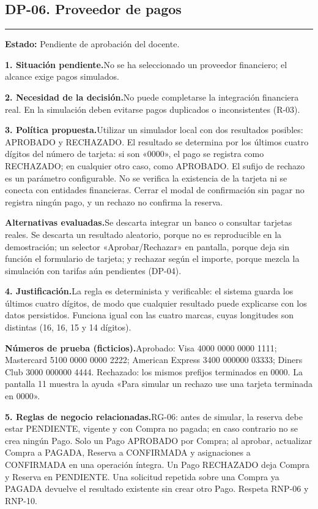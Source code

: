 \documentclass[11pt,a4paper]{article}
\newcommand{\fichacampo}[2]{\noindent\textbf{\color{azulvip}#1}\enspace #2\par\vspace{3pt}}
\begin{document}
\subsection{DP-06. Proveedor de pagos}
{\color{doradovip}\rule{\textwidth}{.5pt}}
\textbf{Estado:} Pendiente de aprobación del docente.\par\vspace{4pt}
{\normalsize
\fichacampo{1. Situación pendiente.}{No se ha seleccionado un proveedor financiero; el alcance exige pagos simulados.}
\fichacampo{2. Necesidad de la decisión.}{No puede completarse la integración financiera real. En la simulación deben evitarse pagos duplicados o inconsistentes (R-03).}
\fichacampo{3. Política propuesta.}{Utilizar un simulador local con dos resultados posibles: APROBADO y RECHAZADO. El resultado se determina por los últimos cuatro dígitos del número de tarjeta: si son «0000», el pago se registra como RECHAZADO; en cualquier otro caso, como APROBADO. El sufijo de rechazo es un parámetro configurable. No se verifica la existencia de la tarjeta ni se conecta con entidades financieras. Cerrar el modal de confirmación sin pagar no registra ningún pago, y un rechazo no confirma la reserva.}
\fichacampo{Alternativas evaluadas.}{Se descarta integrar un banco o consultar tarjetas reales. Se descarta un resultado aleatorio, porque no es reproducible en la demostración; un selector «Aprobar/Rechazar» en pantalla, porque deja sin función el formulario de tarjeta; y rechazar según el importe, porque mezcla la simulación con tarifas aún pendientes (DP-04).}
\fichacampo{4. Justificación.}{La regla es determinista y verificable: el sistema guarda los últimos cuatro dígitos, de modo que cualquier resultado puede explicarse con los datos persistidos. Funciona igual con las cuatro marcas, cuyas longitudes son distintas (16, 16, 15 y 14 dígitos).}
\fichacampo{Números de prueba (ficticios).}{Aprobado: Visa 4000 0000 0000 1111; Mastercard 5100 0000 0000 2222; American Express 3400 000000 03333; Diners Club 3000 000000 4444. Rechazado: los mismos prefijos terminados en 0000. La pantalla 11 muestra la ayuda «Para simular un rechazo use una tarjeta terminada en 0000».}
\fichacampo{5. Reglas de negocio relacionadas.}{RG-06: antes de simular, la reserva debe estar PENDIENTE, vigente y con Compra no pagada; en caso contrario no se crea ningún Pago. Solo un Pago APROBADO por Compra; al aprobar, actualizar Compra a PAGADA, Reserva a CONFIRMADA y asignaciones a CONFIRMADA en una operación íntegra. Un Pago RECHAZADO deja Compra y Reserva en PENDIENTE. Una solicitud repetida sobre una Compra ya PAGADA devuelve el resultado existente sin crear otro Pago. Respeta RNP-06 y RNP-10.}
}
\end{document}
